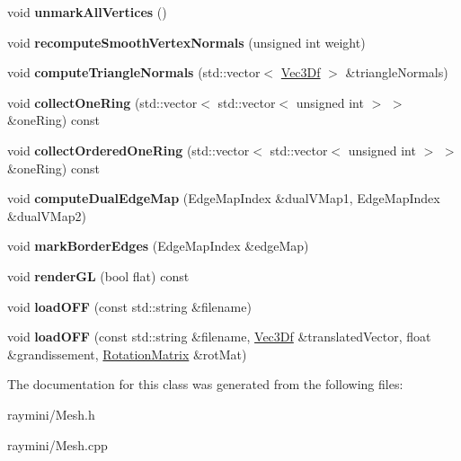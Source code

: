 \begin{DoxyCompactItemize}
\item 
\hypertarget{class_mesh_a5bf95f9557c71f7397b5d468e8c081e1}{
void {\bfseries unmarkAllVertices} ()}
\label{class_mesh_a5bf95f9557c71f7397b5d468e8c081e1}

\item 
\hypertarget{class_mesh_a9cb470310ac2300d068cace3b9ddf222}{
void {\bfseries recomputeSmoothVertexNormals} (unsigned int weight)}
\label{class_mesh_a9cb470310ac2300d068cace3b9ddf222}

\item 
\hypertarget{class_mesh_adb597894886af67deefb9abce6833c95}{
void {\bfseries computeTriangleNormals} (std::vector$<$ \hyperlink{class_vec3_d}{Vec3Df} $>$ \&triangleNormals)}
\label{class_mesh_adb597894886af67deefb9abce6833c95}

\item 
\hypertarget{class_mesh_ad615ce139902c658b6afa192e04e60a0}{
void {\bfseries collectOneRing} (std::vector$<$ std::vector$<$ unsigned int $>$ $>$ \&oneRing) const }
\label{class_mesh_ad615ce139902c658b6afa192e04e60a0}

\item 
\hypertarget{class_mesh_abd301b4995d59fdd09b631c1162d97f1}{
void {\bfseries collectOrderedOneRing} (std::vector$<$ std::vector$<$ unsigned int $>$ $>$ \&oneRing) const }
\label{class_mesh_abd301b4995d59fdd09b631c1162d97f1}

\item 
\hypertarget{class_mesh_a2734381378be9cb9c8349e7bbfb6f2e9}{
void {\bfseries computeDualEdgeMap} (EdgeMapIndex \&dualVMap1, EdgeMapIndex \&dualVMap2)}
\label{class_mesh_a2734381378be9cb9c8349e7bbfb6f2e9}

\item 
\hypertarget{class_mesh_ac461b001aa91580cc939e0ad15d7bdb6}{
void {\bfseries markBorderEdges} (EdgeMapIndex \&edgeMap)}
\label{class_mesh_ac461b001aa91580cc939e0ad15d7bdb6}

\item 
\hypertarget{class_mesh_a454105bfe72190b81331641be2edf3ec}{
void {\bfseries renderGL} (bool flat) const }
\label{class_mesh_a454105bfe72190b81331641be2edf3ec}

\item 
\hypertarget{class_mesh_a1b9cb544aed0779cd165703979b83315}{
void {\bfseries loadOFF} (const std::string \&filename)}
\label{class_mesh_a1b9cb544aed0779cd165703979b83315}

\item 
\hypertarget{class_mesh_ad440dee62af2c492a89255310d8068bd}{
void {\bfseries loadOFF} (const std::string \&filename, \hyperlink{class_vec3_d}{Vec3Df} \&translatedVector, float \&grandissement, \hyperlink{class_rotation_matrix}{RotationMatrix} \&rotMat)}
\label{class_mesh_ad440dee62af2c492a89255310d8068bd}

\end{DoxyCompactItemize}


The documentation for this class was generated from the following files:\begin{DoxyCompactItemize}
\item 
raymini/Mesh.h\item 
raymini/Mesh.cpp\end{DoxyCompactItemize}
